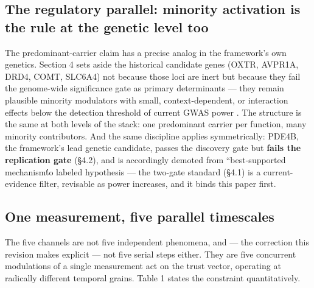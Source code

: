 \documentclass[11pt,twocolumn]{article}
\theoremstyle{plain}
\begin{document}
\subsection{The regulatory parallel: minority activation is the rule at the genetic level too}

The predominant-carrier claim has a precise analog in the framework's own genetics. Section 4 sets aside the historical candidate genes (OXTR, AVPR1A, DRD4, COMT, SLC6A4) not because those loci are inert but because they fail the genome-wide significance gate as primary determinants — they remain plausible minority modulators with small, context-dependent, or interaction effects below the detection threshold of current GWAS power \citep[major depression; the trust-relevant candidate literature shares the same methodology and era]{border2019}. The structure is the same at both levels of the stack: one predominant carrier per function, many minority contributors. And the same discipline applies symmetrically: PDE4B, the framework's lead genetic candidate, passes the discovery gate but \textbf{fails the replication gate} (\S{}4.2), and is accordingly demoted from ``best-supported mechanism\'\' to labeled hypothesis — the two-gate standard (\S{}4.1) is a current-evidence filter, revisable as power increases, and it binds this paper first.

\subsection{One measurement, five parallel timescales}

The five channels are not five independent phenomena, and — the correction this revision makes explicit — not five serial steps either. They are five concurrent modulations of a single measurement act on the trust vector, operating at radically different temporal grains. Table 1 states the constraint quantitatively.
\end{document}
